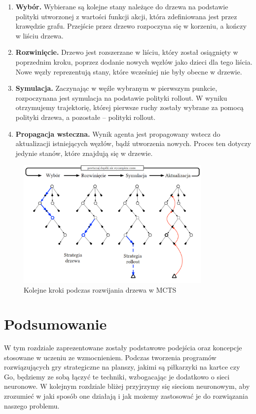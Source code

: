 \documentclass[licencjacka]{pracamgr}
\begin{document}
\begin{enumerate}
\item \textbf{Wybór.} Wybierane są kolejne stany należące do drzewa na podstawie polityki utworzonej z wartości funkcji akcji, która zdefiniowana jest przez krawędzie grafu. Przejście przez drzewo rozpoczyna się w korzeniu, a kończy w liściu drzewa.
\item \textbf{Rozwinięcie.} Drzewo jest rozszerzane w liściu, który został osiągnięty w poprzednim kroku, poprzez dodanie nowych węzłów jako dzieci dla tego liścia. Nowe węzły reprezentują stany, które wcześniej nie były obecne w drzewie.
\item \textbf{Symulacja.} Zaczynając w węźle wybranym w pierwszym punkcie, rozpoczynana jest symulacja na podstawie polityki rollout. W wyniku otrzymujemy trajektorię, której pierwsze ruchy zostały wybrane za pomocą polityki drzewa, a pozostałe -- polityki rollout.
\item \textbf{Propagacja wsteczna.} Wynik agenta jest propagowany wstecz do aktualizacji istniejących węzłów, bądź utworzenia nowych. Proces ten dotyczy jedynie stanów, które znajdują się w drzewie.
\end{enumerate}


\begin{figure}[ht!]
  \centering
  \includegraphics[width=0.85\textwidth]{mcts}
  \caption{Kolejne kroki podczas rozwijania drzewa w MCTS}
\end{figure}


\section{Podsumowanie}

W tym rozdziale zaprezentowane zostały podstawowe podejścia oraz koncepcje stosowane w uczeniu ze wzmocnieniem. Podczas tworzenia programów rozwiązujących gry strategiczne na planszy, jakimi są piłkarzyki na kartce czy Go, będziemy ze sobą łączyć te techniki, wzbogacając je dodatkowo o sieci neuronowe. W kolejnym rozdziale bliżej przyjrzymy się sieciom neuronowym, aby zrozumieć w jaki sposób one działają i jak możemy zastosować je do rozwiązania naszego problemu.
\end{document}
